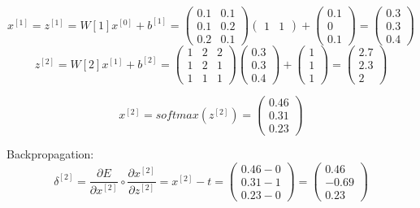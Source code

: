 \documentclass{article}
\begin{document}
\begin{enumerate}[leftmargin=\labelsep]
\begin{equation*}
  x^{[1]} = z^{[1]} = W[1] x^{[0]} + b^{[1]} =
  \begin{pmatrix}
    0.1 & 0.1 \\
    0.1 & 0.2 \\
    0.2 & 0.1 
  \end{pmatrix}
  \begin{pmatrix}
    1 & 1 
  \end{pmatrix} +
  \begin{pmatrix}
    0.1 \\
    0 \\
    0.1
  \end{pmatrix} =
  \begin{pmatrix}
    0.3 \\
    0.3 \\
    0.4
  \end{pmatrix}
\end{equation*}
\begin{equation*}
  z^{[2]} = W[2] x^{[1]} + b^{[2]} =
  \begin{pmatrix}
    1 & 2 & 2 \\
    1 & 2 & 1 \\
    1 & 1 & 1
  \end{pmatrix}
  \begin{pmatrix}
    0.3 \\
    0.3 \\
    0.4
  \end{pmatrix} +
  \begin{pmatrix}
    1 \\
    1 \\
    1
  \end{pmatrix} =
  \begin{pmatrix}
    2.7 \\
    2.3 \\
    2
  \end{pmatrix}
\end{equation*}

\begin{equation*}
  x^{[2]} = softmax(z^{[2]}) =
  \begin{pmatrix}
    0.46 \\
    0.31 \\
    0.23
  \end{pmatrix}
\end{equation*}

Backpropagation:
\begin{equation*}
  \delta^{[2]}=\frac{\partial E}{\partial x^{[2]}} \circ \frac{\partial x^{[2]}}{\partial z^{[2]}} = x^{[2]} - t = 
  \begin{pmatrix}
    0.46 - 0 \\
    0.31 - 1 \\
    0.23 - 0
    \end{pmatrix} =
    \begin{pmatrix}
      0.46 \\
      -0.69 \\
      0.23
      \end{pmatrix}
\end{equation*}


\end{enumerate}
\end{document}
